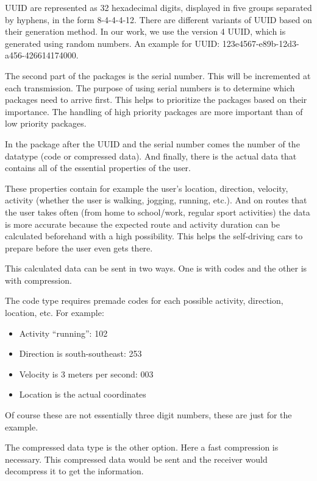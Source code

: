 \documentclass[conference]{IEEEtran}
\begin{document}
UUID are represented as 32 hexadecimal digits, displayed in five groups separated by hyphens, in the form 8-4-4-4-12. There are different variants of UUID based on their generation method. In our work, we use the version 4 UUID, which is generated using random numbers. An example for UUID: 123e4567-e89b-12d3-a456-426614174000.

The second part of the packages is the serial number. This will be incremented at each transmission. The purpose of using serial numbers is to determine which packages need to arrive first. This helps to prioritize the packages based on their importance. The handling of high priority packages are more important than of low priority packages.

In the package after the UUID and the serial number comes the number of the datatype (code or compressed data). And finally, there is the actual data that contains all of the essential properties of the user.

These properties contain for example the user’s location, direction, velocity, activity (whether the user is walking, jogging, running, etc.). And on routes that the user takes often (from home to school/work, regular sport activities) the data is more accurate because the expected route and activity duration can be calculated beforehand with a high possibility. This helps the self-driving cars to prepare before the user even gets there.

This calculated data can be sent in two ways. One is with codes and the other is with compression.

The code type requires premade codes for each possible activity, direction, location, etc.
For example:

\begin{itemize}
    \item Activity “running”: 102
    \item Direction is south-southeast: 253
    \item Velocity is 3 meters per second: 003
    \item Location is the actual coordinates
\end{itemize}

Of course these are not essentially three digit numbers, these are just for the example.

The compressed data type is the other option. Here a fast compression is necessary. This compressed data would be sent and the receiver would decompress it to get the information.
\end{document}
